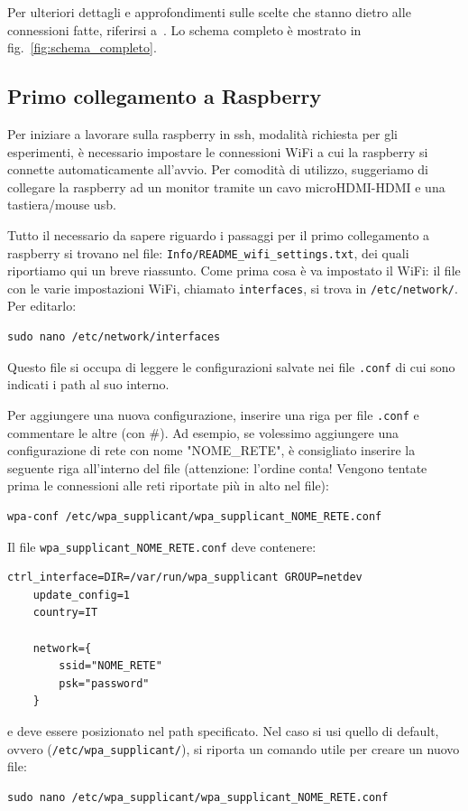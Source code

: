 Per ulteriori dettagli e approfondimenti sulle scelte che stanno dietro alle connessioni fatte, riferirsi a~\cite{ptvlocalizzazione}.
Lo schema completo è mostrato in fig.~\ref{fig:schema_completo}.

\subsection{Primo collegamento a Raspberry}
\label{sez: primo collegamento a raspberry}

Per iniziare a lavorare sulla raspberry in ssh, modalit\`a richiesta per gli esperimenti, \`e necessario impostare le connessioni WiFi a cui la raspberry si
connette automaticamente all'avvio. Per comodit\`a di utilizzo, suggeriamo di collegare la raspberry ad un monitor tramite un cavo microHDMI-HDMI e una tastiera/mouse usb.

Tutto il necessario da sapere riguardo i passaggi per il primo collegamento a raspberry si trovano nel file: \texttt{Info/README\_wifi\_settings.txt}, dei quali riportiamo qui un breve riassunto.
Come prima cosa è va impostato il WiFi: il file con le varie impostazioni WiFi, chiamato \texttt{interfaces}, si trova in \texttt{/etc/network/}. Per editarlo:
\begin{lstlisting}[style=bash]
	sudo nano /etc/network/interfaces
\end{lstlisting}
Questo file si occupa di leggere le configurazioni salvate nei file \texttt{.conf} di cui sono indicati i path al suo interno. 

Per aggiungere una nuova configurazione, inserire una riga per file \texttt{.conf} e commentare le altre (con \#).
Ad esempio, se volessimo aggiungere una configurazione di rete con nome "NOME\_RETE", \`e consigliato inserire la seguente riga all'interno del file (attenzione: l'ordine conta! Vengono tentate prima le connessioni alle reti riportate più in alto nel file):
\begin{lstlisting}[style=xml]
	wpa-conf /etc/wpa_supplicant/wpa_supplicant_NOME_RETE.conf
\end{lstlisting}
Il file \verb|wpa_supplicant_NOME_RETE.conf| deve contenere:
\begin{lstlisting}[style=xml]
	ctrl_interface=DIR=/var/run/wpa_supplicant GROUP=netdev
	update_config=1
	country=IT

	network={
		ssid="NOME_RETE"
		psk="password"
	}
\end{lstlisting}
e deve essere posizionato nel path specificato. 
Nel caso si usi quello di default, ovvero (\texttt{/etc/wpa\_supplicant/}), si riporta un comando utile per creare un nuovo file:
\begin{lstlisting}[style=bash]
	sudo nano /etc/wpa_supplicant/wpa_supplicant_NOME_RETE.conf
\end{lstlisting}

